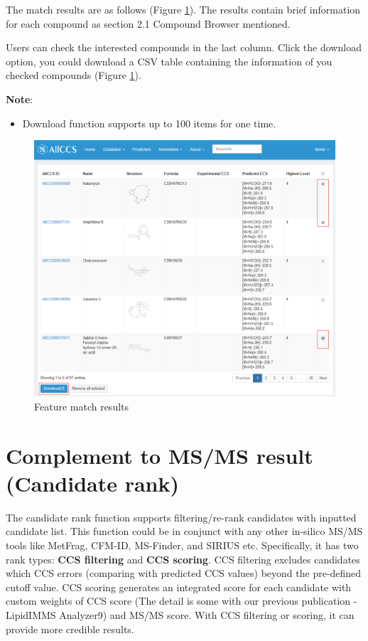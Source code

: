 \documentclass[12pt,]{book}
\providecommand{\tightlist}{%
  \setlength{\itemsep}{0pt}\setlength{\parskip}{0pt}}
\begin{document}
The match results are as follows (Figure \ref{fig:figure4d2}). The
results contain brief information for each compound as section 2.1
Compound Browser mentioned.

Users can check the interested compounds in the last column. Click the
download option, you could download a CSV table containing the
information of you checked compounds (Figure \ref{fig:figure4d2}).

\textbf{Note}:

\begin{itemize}
\tightlist
\item
  Download function supports up to 100 items for one time.
\end{itemize}

\begin{figure}

{\centering \includegraphics{images/chapter4/figure4.2feature_match} 

}

\caption{Feature match results}\label{fig:figure4d2}
\end{figure}

\section{Complement to MS/MS result (Candidate rank)}\label{chapter4d2}

The candidate rank function supports filtering/re-rank candidates with
inputted candidate list. This function could be in conjunct with any
other in-silico MS/MS tools like MetFrag, CFM-ID, MS-Finder, and SIRIUS
etc. Specifically, it has two rank types: \textbf{CCS filtering} and
\textbf{CCS scoring}. CCS filtering excludes candidates which CCS errors
(comparing with predicted CCS values) beyond the pre-defined cutoff
value. CCS scoring generates an integrated score for each candidate with
custom weights of CCS score (The detail is some with our previous
publication - LipidIMMS Analyzer9) and MS/MS score. With CCS filtering
or scoring, it can provide more credible results.
\end{document}
